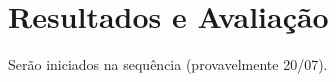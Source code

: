 \chapter{Resultados e Avaliação} \label{ch:evaluation}

Serão iniciados na sequência (provavelmente 20/07).